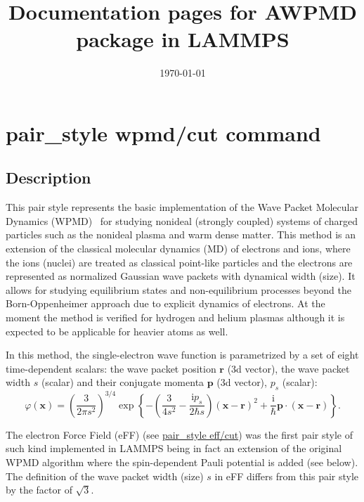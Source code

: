 \documentclass[a4paper,12pt]{article}
\begin{document}
\title{Documentation pages for AWPMD package in LAMMPS}
\date{\today}
\maketitle

\section*{pair\_style wpmd/cut command}

\subsection*{Description}

This pair style represents the basic implementation of the Wave Packet Molecular Dynamics (WPMD)~\cite{Klakow:JCP94} for studying nonideal (strongly coupled) systems of charged particles such as the nonideal plasma and warm dense matter. This method is an extension of the classical molecular dynamics (MD) of electrons and ions, where the ions (nuclei) are treated as classical point-like particles and the electrons are represented as normalized Gaussian wave packets with dynamical width (size). It allows for studying equilibrium states and non-equilibrium processes beyond the Born-Oppenheimer approach due to explicit dynamics of electrons. At the moment the method is verified for hydrogen and helium plasmas although it is expected to be applicable for heavier atoms as well.

In this method, the single-electron wave function is parametrized by a set of eight time-dependent scalars: the wave packet position $\mathbf{r}$ (3d vector), the wave packet width $s$ (scalar) and their conjugate momenta $\mathbf{p}$ (3d vector), $p_s$ (scalar):
\begin{equation}
  \varphi(\mathbf{x}) = \left( \frac{3}{2\pi s^2} \right)^{3/4}
  \exp \left\{
  - \left(\frac{3}{4s^2} - \frac{\mathrm{i}{p_s}}{2\hbar s} \right)
  (\mathbf{x}-\mathbf{r})^2 + \frac{\mathrm{i}}{\hbar}{\mathbf{p}} \cdot (\mathbf{x}-\mathbf{r})
  \right\}.
\end{equation}

The electron Force Field (eFF) (see \href{pair_eff.html}{pair\_style eff/cut}) was the first pair style of such kind implemented in LAMMPS  being in fact an extension of the original WPMD algorithm where the spin-dependent Pauli potential is added (see below). The definition of the wave packet width (size) $s$ in eFF differs from this pair style by the factor of $\sqrt{3}$.
\end{document}
